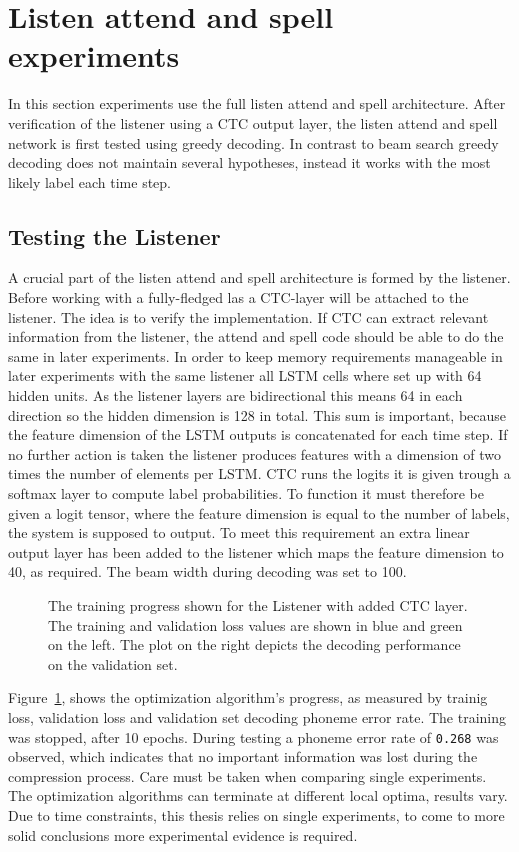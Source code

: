 \section{Listen attend and spell experiments}
In this section experiments use the full listen attend and spell architecture. After verification of the listener using a CTC output layer, the listen attend and spell network is first tested using greedy decoding. In contrast to beam search greedy decoding does not maintain several hypotheses, instead it works with the most likely label each time step.

\subsection{Testing the Listener}
A crucial part of the listen attend and spell architecture is formed by the listener. Before working with a fully-fledged las a CTC-layer will be attached to the listener.
The idea is to verify the implementation. If CTC can extract relevant information from the listener, the attend and spell code should be able to do the same in later experiments. In order to keep memory requirements manageable in later experiments with the same listener all LSTM cells where set up with 64 hidden units. As the listener layers are bidirectional this means 64 in each direction so the hidden dimension is 128 in total. This sum is important, because the feature dimension of the LSTM outputs is concatenated for each time step. If no further action is taken the listener produces features with a dimension of two times the number of elements per LSTM.
CTC runs the logits it is given trough a softmax layer to compute label probabilities. To function it must therefore be given a logit tensor, where the feature dimension is equal to the number of labels, the system is supposed to output. To meet this requirement an extra linear output layer has been added to the listener which maps the feature dimension to 40, as required. The beam width during decoding was set to 100. 
\begin{figure}


\caption{The training progress shown for the Listener with added CTC layer. The training and validation loss values are shown in blue and green on the left. The plot on the right depicts the decoding performance on the validation set.}
\label{fig:listenCTC}
\end{figure}
Figure~\ref{fig:listenCTC}, shows the optimization algorithm's progress, as measured by trainig loss, validation loss and validation set decoding phoneme error rate. The training was stopped, after 10 epochs. During testing a phoneme error rate of \texttt{0.268} was observed, which indicates that no important information was lost during the compression process. Care must be taken when comparing single experiments. The optimization algorithms can terminate at different local optima, results vary. Due to time constraints, this thesis relies on single experiments, to come to more solid conclusions more experimental evidence is required.



